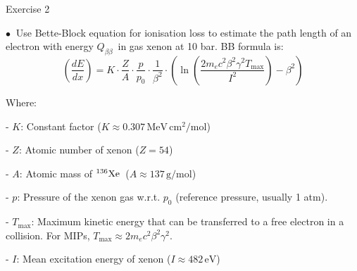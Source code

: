 \documentclass [aspectratio=169]{beamer}
\newcommand{\qbb}{\ensuremath{Q_{\beta\beta}}}
\newcommand{\XE}{\ensuremath{{}^{136}{\rm Xe}}}
\begin{document}
 \begin{frame}{Exercise 2}
 
 $\bullet~$ Use Bette-Block equation for ionisation loss to estimate the path length of an electron with energy \qbb\ in gas xenon at 10 bar. BB formula is:
 \[
\left( \frac{dE}{dx} \right) = K \cdot \frac{Z}{A} \cdot \frac{p}{p_0} \cdot \frac{1}{\beta^2} \cdot \left( \ln \left( \frac{2 m_e c^2 \beta^2 \gamma^2 T_{\text{max}}}{I^2} \right) - \beta^2 \right)
\]

Where:

- \( K \): Constant factor (\(K \approx 0.307 \, \mathrm{MeV \, cm^2 / mol}\))

- \( Z \): Atomic number of xenon (\(Z = 54\))

- \( A \): Atomic mass of \XE\ (\(A \approx 137 \, \mathrm{g/mol}\))

- \( p \): Pressure of the xenon gas w.r.t.  \( p_0 \) (reference pressure, usually 1 atm). 

- \( T_{\text{max}} \): Maximum kinetic energy that can be transferred to a free electron in a collision. 
%
  For MIPs,  \(T_{\text{max}} \approx 2 m_e c^2 \beta^2 \gamma^2\).

- \( I \): Mean excitation energy of xenon (\(I \approx 482 \, \mathrm{eV}\))

\end{frame}
\end{document}
